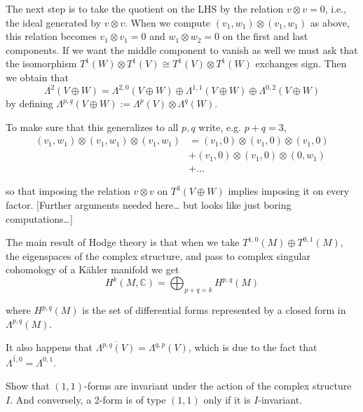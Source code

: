 The next step is to take the quotient on the LHS
by the relation $v \otimes v=0$,
i.e., the ideal generated by $v \otimes v$.
When we compute $(v_1,w_1)\otimes(v_1,w_1)$ 
as above,
this relation becomes $v_1 \otimes v_1=0$ 
and $w_1\otimes w_2=0$ on the first and last components.
If we want the middle component to vanish as well
we must ask that the isomorphism 
$T^1(W) \otimes  T^1(V)\cong T^1(V) \otimes  T^1(W)$
exchanges sign. Then we obtain that
$$
\Lambda^2(V \oplus W)
=\Lambda^{2,0}(V\oplus W)
\oplus\Lambda^{1,1}(V\oplus W)
\oplus\Lambda^{0,2}(V \oplus W)
$$
by defining $\Lambda^{p,q}(V \oplus W):=\Lambda^p(V)\otimes \Lambda^q(W)$.

To make sure that this generalizes to all $p,q$ 
write, e.g. $p+q=3$,
\begin{align*}
(v_1,w_1)\otimes(v_1,w_1)\otimes(v_1,w_1)
&=(v_1,0)\otimes(v_1,0)\otimes(v_1,0)\\
&+(v_1,0)\otimes(v_1,0)\otimes(0,w_1)\\
&+…
\end{align*}

\noindent
so that imposing the relation $v \otimes v$ on $T^3(V \oplus W)$
implies imposing it on every factor.
[Further arguments needed here… but looks like just boring computations…]

\medskip\noindent
The main result of Hodge theory is that
when we take $T^{1,0}(M)\oplus T^{0,1}(M)$,
the eigenspaces of the complex structure,
and pass to complex singular cohomology of a Kähler manifold we get
\begin{equation}
\label{equation-hodge-theorem}
H^{k}(M,\mathbb{C})
=\bigoplus_{p+q=k}H^{p,q}(M)
\end{equation}

\noindent
where $H^{p,q}(M)$ is the set of differential forms
represented by a closed form in $\Lambda^{p,q}(M)$.

\medskip\noindent
It also happens that
$\overline{\Lambda^{p,q}(V)}=\Lambda^{q,p}(V)$,
which is due to the fact that
$\overline{\Lambda^{1,0}}=\Lambda^{0,1}$.


\begin{exercise}
\label{exercise-1,1-forms-are-i-invariant}
Show that $(1,1)$-forms are invariant under the action of
the complex structure $I$.
And conversely, a 2-form is of type $(1,1)$ 
only if it is $I$-invariant.
\end{exercise}

